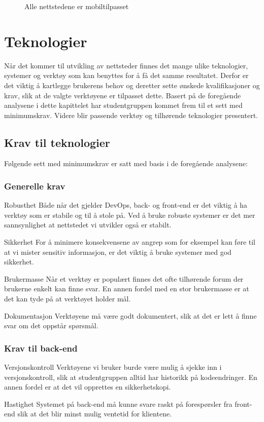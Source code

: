 \begin{figure}[H]
\begin{center}
        \caption{Alle nettstedene er mobiltilpasset}
        \label{fig:competitors-mobile}
    \end{center}
\end{figure}

\section{Teknologier}
Når det kommer til utvikling av nettsteder finnes det mange ulike teknologier, systemer og verktøy som kan benyttes for å få det samme resultatet. Derfor er det viktig å kartlegge brukerens behov og deretter sette ønskede kvalifikasjoner og krav, slik at de valgte verktøyene er tilpasset dette. Basert på de foregående analysene i dette kapittelet har studentgruppen kommet frem til et sett med minimumskrav. Videre blir passende verktøy og tilhørende teknologier presentert.

\subsection{Krav til teknologier}
Følgende sett med minimumskrav er satt med basis i de foregående analysene:

\subsubsection{Generelle krav}

\begin{compactdesc}
\item [Robusthet] Både når det gjelder DevOps, back- og front-end er det viktig å ha verktøy som er stabile og til å stole på. Ved å bruke robuste systemer er det mer sannsynlighet at nettstedet vi utvikler også er stabilt.
\item [Sikkerhet] For å minimere konsekvensene av angrep som for eksempel kan føre til at vi mister sensitiv informasjon, er det viktig å bruke systemer med god sikkerhet.
\item [Brukermasse] Når et verktøy er populært finnes det ofte tilhørende forum der brukerne enkelt kan finne svar. En annen fordel med en stor brukermasse er at det kan tyde på at verktøyet holder mål.
\item [Dokumentasjon] Verktøyene må være godt dokumentert, slik at det er lett å finne svar om det oppstår spørsmål.
\end{compactdesc}

\subsubsection{Krav til back-end}
\label{sec:analysis-tools-requirements-back-end}
\begin{compactdesc}
\item [Versjonskontroll] Verktøyene vi bruker burde være mulig å sjekke inn i versjonskontroll, slik at studentgruppen alltid har historikk på kodeendringer. En annen fordel er at det vil opprettes en sikkerhetskopi.
\item [Hastighet] Systemet på back-end må kunne svare raskt på forespørsler fra front-end slik at det blir minst mulig ventetid for klientene.
\end{compactdesc}


